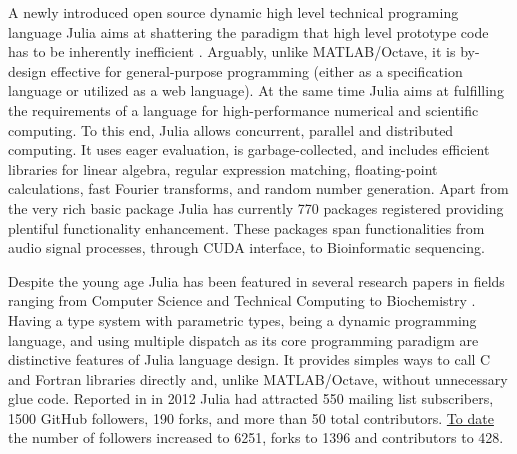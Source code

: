 A newly introduced open source dynamic high level technical programing language Julia aims at shattering the paradigm that high level prototype code has to be inherently inefficient \cite{bezanson2012julia, bezanson2014julia}. Arguably, unlike MATLAB/Octave, it is by-design effective for general-purpose programming (either as a specification language or utilized as a web language). At the same time Julia aims at fulfilling the requirements of a language for high-performance numerical and scientific computing. To this end, Julia allows concurrent, parallel and distributed computing. It uses eager evaluation, is garbage-collected, and includes efficient libraries for linear algebra, regular expression matching, floating-point calculations, fast Fourier transforms, and random number generation. Apart from the very rich basic package Julia has currently 770 packages registered providing plentiful functionality enhancement. These packages span functionalities from audio signal processes, through CUDA interface, to Bioinformatic sequencing.

Despite the young age Julia has been featured in several research papers in fields ranging from Computer Science and Technical Computing \cite{Heitzinger_2014, Knopp_2014, Foulds_2013} to Biochemistry \cite{Baldassi_2014}. Having a type system with parametric types, being a dynamic programming language, and using multiple dispatch as its core programming paradigm are distinctive features of Julia language design. It provides simples ways to call C and Fortran libraries directly and, unlike MATLAB/Octave, without unnecessary glue code. Reported in \cite{bezanson2012julia} in 2012 Julia had attracted 550 mailing list subscribers, 1500 GitHub followers, 190 forks, and more than 50 total contributors. \href{https://github.com/JuliaLang/julia}{To date} the number of followers increased to 6251, forks to 1396 and contributors to 428. 

